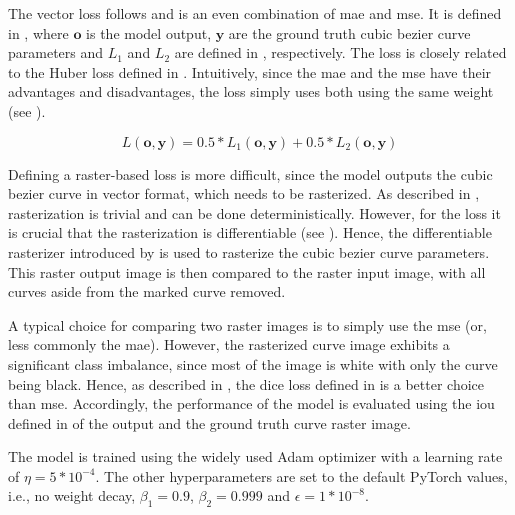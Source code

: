 The vector loss follows \citep{DBLP:conf/eccv/EgiazarianVAVST20} and is an even combination of \gls{mae} and \gls{mse}. It is defined in , where $\mathbf{o}$ is the model output, $\mathbf{y}$ are the ground truth cubic bezier curve parameters and $L_1$ and $L_2$ are defined in , respectively. The loss is closely related to the Huber loss defined in . Intuitively, since the \gls{mae} and the \gls{mse} have their advantages and disadvantages, the loss simply uses both using the same weight (see ).

\begin{equation}
    \label{eq:model.loss}
    L(\mathbf{o},\mathbf{y})=0.5*L_1(\mathbf{o},\mathbf{y})+0.5*L_2(\mathbf{o},\mathbf{y})
\end{equation}

Defining a raster-based loss is more difficult, since the model outputs the cubic bezier curve in vector format, which needs to be rasterized. As described in , rasterization is trivial and can be done deterministically. However, for the loss it is crucial that the rasterization is differentiable (see ). Hence, the differentiable rasterizer introduced by \citet{Li:2020:DVG} is used to rasterize the cubic bezier curve parameters. This raster output image is then compared to the raster input image, with all curves aside from the marked curve removed.

A typical choice for comparing two raster images is to simply use the \gls{mse} (or, less commonly the \gls{mae}). However, the rasterized curve image exhibits a significant class imbalance, since most of the image is white with only the curve being black. Hence, as described in , the dice loss defined in  is a better choice than \gls{mse}. Accordingly, the performance of the model is evaluated using the \gls{iou} defined in  of the output and the ground truth curve raster image.

The model is trained using the widely used Adam \citep{DBLP:journals/corr/KingmaB14} optimizer with a learning rate of $\eta=5*10^{-4}$. The other hyperparameters are set to the default PyTorch \citep{Paszke_PyTorch_An_Imperative_2019} values, i.e., no weight decay, $\beta_1=0.9$, $\beta_2=0.999$ and $\epsilon=1*10^{-8}$.

